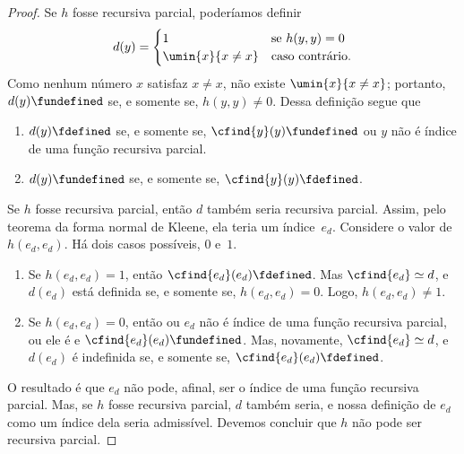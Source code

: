 \documentclass[../../../include/open-logic-section]{subfiles}
\begin{document}
\begin{proof}
Se $h$
fosse recursiva parcial, poderíamos definir
\[
d(y) =
\begin{cases}
1 & \text{se $h(y, y) = 0$}\\
\umin{x}{x \neq x} & \text{caso contrário.}
\end{cases}
\]
Como nenhum número $x$ satisfaz $x \neq x$, não existe
$\umin{x}{x \neq x}$; portanto, $d(y) \fundefined$ se, e somente se,
$h(y,y) \neq 0$. Dessa definição segue que
\begin{enumerate}
\item $d(y) \fdefined$ se, e somente se, $\cfind{y}(y) \fundefined$
  ou $y$ não é índice de uma função recursiva parcial.
\item $d(y) \fundefined$ se, e somente se, $\cfind{y}(y) \fdefined$.
\end{enumerate}
Se $h$ fosse recursiva parcial, então $d$ também seria recursiva
parcial. Assim, pelo teorema da forma normal de Kleene, ela teria um
índice~$e_d$. Considere o valor de $h(e_d, e_d)$. Há dois casos
possíveis, $0$ e~$1$.
\begin{enumerate}
\item Se $h(e_d, e_d) = 1$, então $\cfind{e_d}(e_d) \fdefined$. Mas
  $\cfind{e_d} \simeq d$, e $d(e_d)$ está definida se, e somente se,
  $h(e_d, e_d) = 0$. Logo, $h(e_d, e_d) \neq 1$.
\item Se $h(e_d, e_d) = 0$, então ou $e_d$ não é índice de uma função
  recursiva parcial, ou ele é e $\cfind{e_d}(e_d) \fundefined$. Mas,
  novamente, $\cfind{e_d} \simeq d$, e $d(e_d)$ é indefinida se, e
  somente se, $\cfind{e_d}(e_d) \fdefined$.
\end{enumerate}
O resultado é que $e_d$ não pode, afinal, ser o índice de uma função
recursiva parcial. Mas, se $h$ fosse recursiva parcial, $d$ também
seria, e nossa definição de $e_d$ como um índice dela seria
admissível. Devemos concluir que $h$ não pode ser recursiva parcial.
\end{proof}
\end{document}
